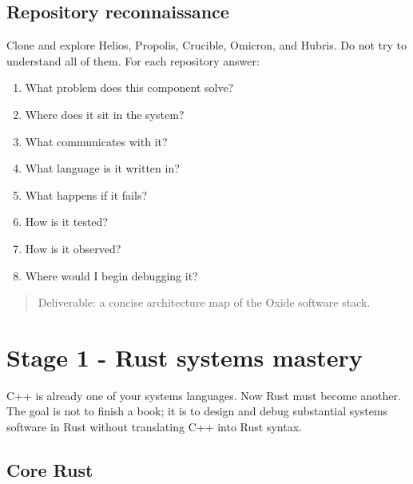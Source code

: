 \documentclass[11pt,letterpaper]{article}
\begin{document}
\subsection*{Repository reconnaissance}

Clone and explore Helios, Propolis, Crucible, Omicron, and Hubris. Do not try to understand all of them. For each repository answer:

\begin{enumerate}

\item What problem does this component solve?

\item Where does it sit in the system?

\item What communicates with it?

\item What language is it written in?

\item What happens if it fails?

\item How is it tested?

\item How is it observed?

\item Where would I begin debugging it?

\end{enumerate}

\begin{quote}
Deliverable: a concise architecture map of the Oxide software stack.
\end{quote}

\section{Stage 1 - Rust systems mastery}\label{sec:5}

\label{stage:1}

C++ is already one of your systems languages. Now Rust must become another. The goal is not to finish a book; it is to design and debug substantial systems software in Rust without translating C++ into Rust syntax.

\subsection*{Core Rust}
\end{document}
